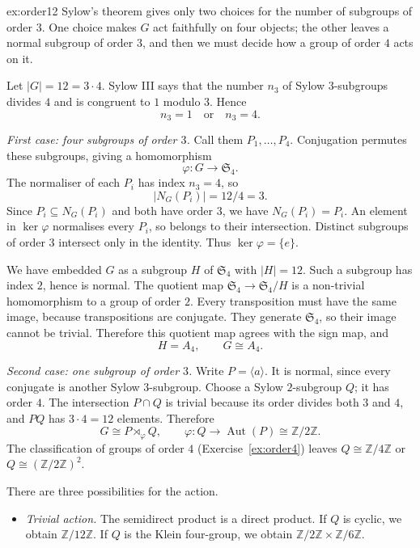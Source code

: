 \begin{solution}{ex:order12}
\idea Sylow's theorem gives only two choices for the number of subgroups of order $3$. One choice makes $G$ act faithfully on four objects; the other leaves a normal subgroup of order $3$, and then we must decide how a group of order $4$ acts on it.

\writeup Let $|G|=12=3\cdot4$. Sylow III says that the number $n_3$ of Sylow $3$-subgroups divides $4$ and is congruent to $1$ modulo $3$. Hence
\[
\boxed{n_3=1\quad\text{or}\quad n_3=4.}
\]

\emph{First case: four subgroups of order $3$.}
Call them $P_1,\ldots,P_4$. Conjugation permutes these subgroups, giving a homomorphism
\[
\varphi:G\longrightarrow\mathfrak S_4.
\]
The normaliser of each $P_i$ has index $n_3=4$, so
\[
|N_G(P_i)|=12/4=3.
\]
Since $P_i\subseteq N_G(P_i)$ and both have order $3$, we have $N_G(P_i)=P_i$.
An element in $\ker\varphi$ normalises every $P_i$, so belongs to their intersection. Distinct subgroups of order $3$ intersect only in the identity. Thus $\ker\varphi=\{e\}$.

We have embedded $G$ as a subgroup $H$ of $\mathfrak S_4$ with $|H|=12$. Such a subgroup has index $2$, hence is normal. The quotient map $\mathfrak S_4\to\mathfrak S_4/H$ is a non-trivial homomorphism to a group of order $2$. Every transposition must have the same image, because transpositions are conjugate. They generate $\mathfrak S_4$, so their image cannot be trivial. Therefore this quotient map agrees with the sign map, and
\[
H=A_4,\qquad G\cong A_4.
\]

\emph{Second case: one subgroup of order $3$.}
Write $P=\langle a\rangle$. It is normal, since every conjugate is another Sylow $3$-subgroup. Choose a Sylow $2$-subgroup $Q$; it has order $4$. The intersection $P\cap Q$ is trivial because its order divides both $3$ and $4$, and $PQ$ has $3\cdot4=12$ elements. Therefore
\[
G\cong P\rtimes_\varphi Q,
\qquad
\varphi:Q\longrightarrow\operatorname{Aut}(P)\cong\mathbb Z/2\mathbb Z.
\]
The classification of groups of order $4$ (Exercise~\ref{ex:order4}) leaves $Q\cong\mathbb Z/4\mathbb Z$ or $Q\cong(\mathbb Z/2\mathbb Z)^2$.

There are three possibilities for the action.

\begin{itemize}
\item \emph{Trivial action.} The semidirect product is a direct product. If $Q$ is cyclic, we obtain $\mathbb Z/12\mathbb Z$. If $Q$ is the Klein four-group, we obtain $\mathbb Z/2\mathbb Z\times\mathbb Z/6\mathbb Z$.


\end{itemize}
\end{solution}
